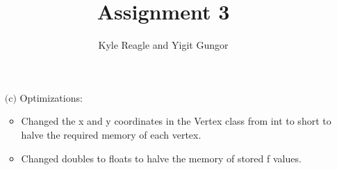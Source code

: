 \documentclass[]{article}
\title{Assignment 3}
\author{Kyle Reagle and Yigit Gungor}
\begin{document}
\maketitle

\begin{enumerate}
	\item[$($c$)$]
	Optimizations:
	\begin{itemize}
		\item Changed the x and y coordinates in the Vertex class from int to short to halve the required memory of each vertex.
		\item Changed doubles to floats to halve the memory of stored f values.
	\end{itemize}

\end{enumerate}
\end{document}
